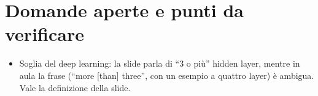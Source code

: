 \section{Domande aperte e punti da verificare}
\begin{verifica}
\begin{itemize}
  \item Soglia del deep learning: la slide parla di ``3 o più'' hidden layer, mentre in aula la frase
    (``more [than] three'', con un esempio a quattro layer) è ambigua. Vale la definizione della slide.
\end{itemize}
\end{verifica}
